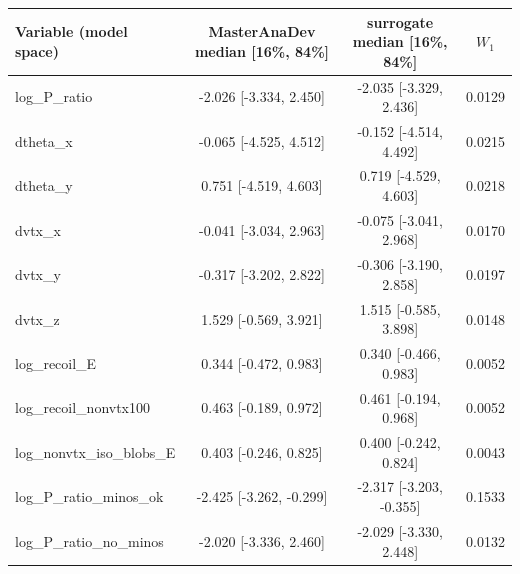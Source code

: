 \begin{tabular}{lccc}
\toprule
Variable (model space) & MasterAnaDev median [16\%, 84\%] & surrogate median [16\%, 84\%] & $W_1$ \\
\midrule
log\_P\_ratio & -2.026 [-3.334, 2.450] & -2.035 [-3.329, 2.436] & 0.0129 \\
dtheta\_x & -0.065 [-4.525, 4.512] & -0.152 [-4.514, 4.492] & 0.0215 \\
dtheta\_y & 0.751 [-4.519, 4.603] & 0.719 [-4.529, 4.603] & 0.0218 \\
dvtx\_x & -0.041 [-3.034, 2.963] & -0.075 [-3.041, 2.968] & 0.0170 \\
dvtx\_y & -0.317 [-3.202, 2.822] & -0.306 [-3.190, 2.858] & 0.0197 \\
dvtx\_z & 1.529 [-0.569, 3.921] & 1.515 [-0.585, 3.898] & 0.0148 \\
log\_recoil\_E & 0.344 [-0.472, 0.983] & 0.340 [-0.466, 0.983] & 0.0052 \\
log\_recoil\_nonvtx100 & 0.463 [-0.189, 0.972] & 0.461 [-0.194, 0.968] & 0.0052 \\
log\_nonvtx\_iso\_blobs\_E & 0.403 [-0.246, 0.825] & 0.400 [-0.242, 0.824] & 0.0043 \\
log\_P\_ratio\_minos\_ok & -2.425 [-3.262, -0.299] & -2.317 [-3.203, -0.355] & 0.1533 \\
log\_P\_ratio\_no\_minos & -2.020 [-3.336, 2.460] & -2.029 [-3.330, 2.448] & 0.0132 \\
\bottomrule
\end{tabular}
